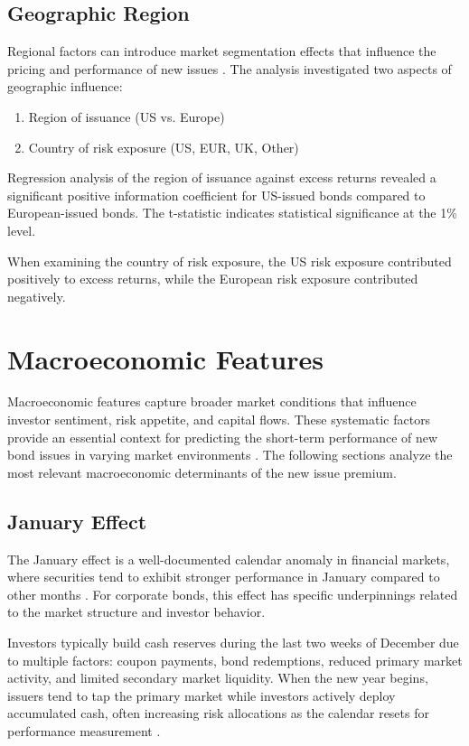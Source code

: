 \subsection{Geographic Region}
Regional factors can introduce market segmentation effects that influence the pricing and performance of new issues \parencite{Geerts2022PredictingYield}. The analysis investigated two aspects of geographic influence:

\begin{enumerate}
    \item Region of issuance (US vs. Europe)
    \item Country of risk exposure (US, EUR, UK, Other)
\end{enumerate}

Regression analysis of the region of issuance against excess returns revealed a significant positive information coefficient for US-issued bonds compared to European-issued bonds. The t-statistic indicates statistical significance at the 1\% level.

When examining the country of risk exposure, the US risk exposure contributed positively to excess returns, while the European risk exposure contributed negatively.

\section{Macroeconomic Features}

Macroeconomic features capture broader market conditions that influence investor sentiment, risk appetite, and capital flows. These systematic factors provide an essential context for predicting the short-term performance of new bond issues in varying market environments \parencite{Geerts2022PredictingYield}. The following sections analyze the most relevant macroeconomic determinants of the new issue premium.

\subsection{January Effect}
The January effect is a well-documented calendar anomaly in financial markets, where securities tend to exhibit stronger performance in January compared to other months \parencite{Nisar2021MunichArchive}. For corporate bonds, this effect has specific underpinnings related to the market structure and investor behavior.

Investors typically build cash reserves during the last two weeks of December due to multiple factors: coupon payments, bond redemptions, reduced primary market activity, and limited secondary market liquidity. When the new year begins, issuers tend to tap the primary market while investors actively deploy accumulated cash, often increasing risk allocations as the calendar resets for performance measurement \parencite{Nisar2021MunichArchive}.

